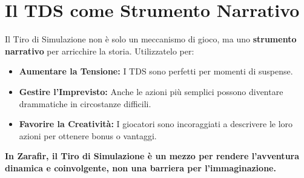 \documentclass[../manuale_main.tex]{subfiles}
\begin{document}
\vspace{0.3cm}

\section{Il TDS come Strumento Narrativo}
Il Tiro di Simulazione non è solo un meccanismo di gioco, ma uno \textbf{strumento narrativo} per arricchire la storia. Utilizzatelo per:

\begin{itemize}
    \item \textbf{Aumentare la Tensione:} I TDS sono perfetti per momenti di suspense.
    \item \textbf{Gestire l'Imprevisto:} Anche le azioni più semplici possono diventare drammatiche in circostanze difficili.
    \item \textbf{Favorire la Creatività:} I giocatori sono incoraggiati a descrivere le loro azioni per ottenere bonus o vantaggi.
\end{itemize}

\textbf{In Zarafir, il Tiro di Simulazione è un mezzo per rendere l’avventura dinamica e coinvolgente, non una barriera per l’immaginazione.}
\end{document}
